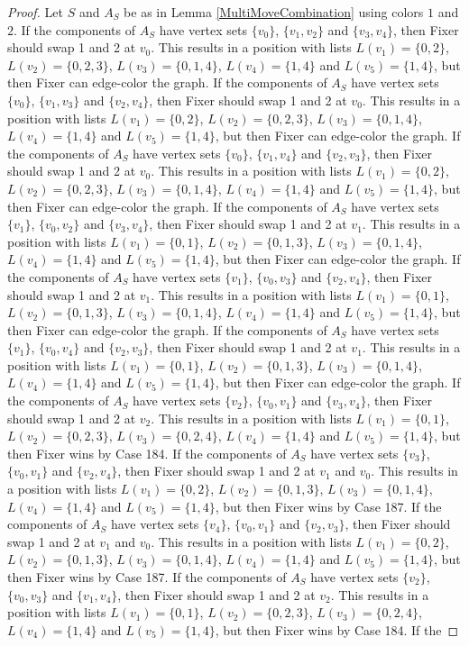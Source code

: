 \documentclass[12pt]{amsart}
\theoremstyle{plain}
\theoremstyle{definition}
\theoremstyle{remark}
\begin{document}
\begin{proof}
Let $S$ and $A_S$ be as in Lemma \ref{MultiMoveCombination} using colors $1$ and $2$. If the components of $A_S$ have vertex sets $\{v_0\}$, $\{v_1, v_2\}$ and $\{v_3, v_4\}$, then Fixer should swap 1 and 2 at $v_0$. This results in a position with lists $L(v_1) = \{0, 2\}$, $L(v_2) = \{0, 2, 3\}$, $L(v_3) = \{0, 1, 4\}$, $L(v_4) = \{1, 4\}$ and $L(v_5) = \{1, 4\}$, but then Fixer can edge-color the graph. If the components of $A_S$ have vertex sets $\{v_0\}$, $\{v_1, v_3\}$ and $\{v_2, v_4\}$, then Fixer should swap 1 and 2 at $v_0$. This results in a position with lists $L(v_1) = \{0, 2\}$, $L(v_2) = \{0, 2, 3\}$, $L(v_3) = \{0, 1, 4\}$, $L(v_4) = \{1, 4\}$ and $L(v_5) = \{1, 4\}$, but then Fixer can edge-color the graph. If the components of $A_S$ have vertex sets $\{v_0\}$, $\{v_1, v_4\}$ and $\{v_2, v_3\}$, then Fixer should swap 1 and 2 at $v_0$. This results in a position with lists $L(v_1) = \{0, 2\}$, $L(v_2) = \{0, 2, 3\}$, $L(v_3) = \{0, 1, 4\}$, $L(v_4) = \{1, 4\}$ and $L(v_5) = \{1, 4\}$, but then Fixer can edge-color the graph. If the components of $A_S$ have vertex sets $\{v_1\}$, $\{v_0, v_2\}$ and $\{v_3, v_4\}$, then Fixer should swap 1 and 2 at $v_1$. This results in a position with lists $L(v_1) = \{0, 1\}$, $L(v_2) = \{0, 1, 3\}$, $L(v_3) = \{0, 1, 4\}$, $L(v_4) = \{1, 4\}$ and $L(v_5) = \{1, 4\}$, but then Fixer can edge-color the graph. If the components of $A_S$ have vertex sets $\{v_1\}$, $\{v_0, v_3\}$ and $\{v_2, v_4\}$, then Fixer should swap 1 and 2 at $v_1$. This results in a position with lists $L(v_1) = \{0, 1\}$, $L(v_2) = \{0, 1, 3\}$, $L(v_3) = \{0, 1, 4\}$, $L(v_4) = \{1, 4\}$ and $L(v_5) = \{1, 4\}$, but then Fixer can edge-color the graph. If the components of $A_S$ have vertex sets $\{v_1\}$, $\{v_0, v_4\}$ and $\{v_2, v_3\}$, then Fixer should swap 1 and 2 at $v_1$. This results in a position with lists $L(v_1) = \{0, 1\}$, $L(v_2) = \{0, 1, 3\}$, $L(v_3) = \{0, 1, 4\}$, $L(v_4) = \{1, 4\}$ and $L(v_5) = \{1, 4\}$, but then Fixer can edge-color the graph. If the components of $A_S$ have vertex sets $\{v_2\}$, $\{v_0, v_1\}$ and $\{v_3, v_4\}$, then Fixer should swap 1 and 2 at $v_2$. This results in a position with lists $L(v_1) = \{0, 1\}$, $L(v_2) = \{0, 2, 3\}$, $L(v_3) = \{0, 2, 4\}$, $L(v_4) = \{1, 4\}$ and $L(v_5) = \{1, 4\}$, but then Fixer wins by Case 184. If the components of $A_S$ have vertex sets $\{v_3\}$, $\{v_0, v_1\}$ and $\{v_2, v_4\}$, then Fixer should swap 1 and 2 at $v_1$ and $v_0$. This results in a position with lists $L(v_1) = \{0, 2\}$, $L(v_2) = \{0, 1, 3\}$, $L(v_3) = \{0, 1, 4\}$, $L(v_4) = \{1, 4\}$ and $L(v_5) = \{1, 4\}$, but then Fixer wins by Case 187. If the components of $A_S$ have vertex sets $\{v_4\}$, $\{v_0, v_1\}$ and $\{v_2, v_3\}$, then Fixer should swap 1 and 2 at $v_1$ and $v_0$. This results in a position with lists $L(v_1) = \{0, 2\}$, $L(v_2) = \{0, 1, 3\}$, $L(v_3) = \{0, 1, 4\}$, $L(v_4) = \{1, 4\}$ and $L(v_5) = \{1, 4\}$, but then Fixer wins by Case 187. If the components of $A_S$ have vertex sets $\{v_2\}$, $\{v_0, v_3\}$ and $\{v_1, v_4\}$, then Fixer should swap 1 and 2 at $v_2$. This results in a position with lists $L(v_1) = \{0, 1\}$, $L(v_2) = \{0, 2, 3\}$, $L(v_3) = \{0, 2, 4\}$, $L(v_4) = \{1, 4\}$ and $L(v_5) = \{1, 4\}$, but then Fixer wins by Case 184. If the 
\end{proof}
\end{document}
